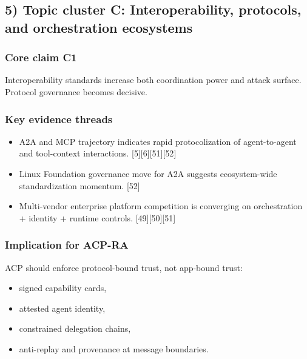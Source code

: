 \documentclass[
]{article}
\providecommand{\tightlist}{%
  \setlength{\itemsep}{0pt}\setlength{\parskip}{0pt}}
\begin{document}
\hypertarget{topic-cluster-c-interoperability-protocols-and-orchestration-ecosystems}{%
\subsection{5) Topic cluster C: Interoperability, protocols, and
orchestration
ecosystems}\label{topic-cluster-c-interoperability-protocols-and-orchestration-ecosystems}}

\hypertarget{core-claim-c1}{%
\subsubsection{Core claim C1}\label{core-claim-c1}}

Interoperability standards increase both coordination power and attack
surface. Protocol governance becomes decisive.

\hypertarget{key-evidence-threads-2}{%
\subsubsection{Key evidence threads}\label{key-evidence-threads-2}}

\begin{itemize}
\tightlist
\item
  A2A and MCP trajectory indicates rapid protocolization of
  agent-to-agent and tool-context interactions.
  {[}5{]}{[}6{]}{[}51{]}{[}52{]}
\item
  Linux Foundation governance move for A2A suggests ecosystem-wide
  standardization momentum. {[}52{]}
\item
  Multi-vendor enterprise platform competition is converging on
  orchestration + identity + runtime controls. {[}49{]}{[}50{]}{[}51{]}
\end{itemize}

\hypertarget{implication-for-acp-ra-2}{%
\subsubsection{Implication for ACP-RA}\label{implication-for-acp-ra-2}}

ACP should enforce protocol-bound trust, not app-bound trust:

\begin{itemize}
\tightlist
\item
  signed capability cards,
\item
  attested agent identity,
\item
  constrained delegation chains,
\item
  anti-replay and provenance at message boundaries.
\end{itemize}
\end{document}
